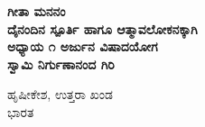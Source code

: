 \begin{titlepage}
    \begin{center}
        \vspace*{0.5cm}
            
        {\Huge
        \textbf{\color{blue}\fontsize{50}{60}\selectfont ಗೀತಾ ಮನನಂ}}
        \textbf{\\ \small \color{black}ದೈನಂದಿನ ಸ್ಪೂರ್ತಿ ಹಾಗೂ ಆತ್ಮಾವಲೋಕನಕ್ಕಾಗಿ}\\ 
		\vspace{1.0cm}
		\textbf{{\large \color{black} ಅಧ್ಯಾಯ ೧ ಅರ್ಜುನ ವಿಷಾದಯೋಗ}}\\		
        \vspace{6.0cm}
        \textbf{{\Large \color{blue}\mananamfont ಸ್ವಾಮಿ ನಿರ್ಗುಣಾನಂದ ಗಿರಿ}}\\    
        
		
            
        \vfill
            
        
            
        \vspace{0.1cm}
        {\color{black}    
		
		{{\large \color{blue}ಹೃಷೀಕೇಶ, ಉತ್ತರಾ ಖಂಡ}\\\normalsize ಭಾರತ}
        }
    \end{center}
\end{titlepage}
\nopagecolor%